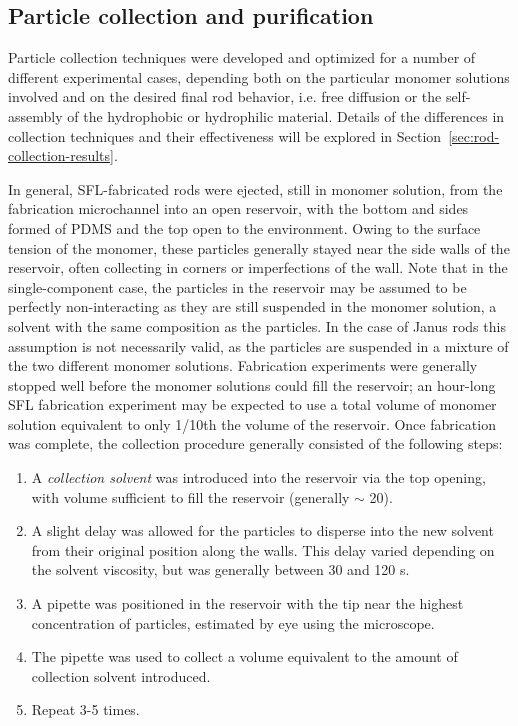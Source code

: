 \begin{itemize}
\end{itemize}


\subsection{Particle collection and purification}

Particle collection techniques were developed and optimized for a number of different experimental cases,
depending both on the particular monomer solutions involved and on the desired final rod behavior, i.e. 
free diffusion or the self-assembly of the hydrophobic or hydrophilic material.  Details of the differences
in collection techniques and their effectiveness will be explored in Section~\ref{sec:rod-collection-results}.

In general, SFL-fabricated rods were ejected, still in monomer solution, from the fabrication microchannel into 
an open reservoir, with the bottom and sides formed of PDMS and the top open to the environment.  Owing to the
surface tension of the monomer, these particles generally stayed near the side walls of the reservoir, often
collecting in corners or imperfections of the wall.  Note that in the single-component case, the particles in
the reservoir may be assumed to be perfectly non-interacting as they are still suspended in the monomer solution, 
a solvent with the
same composition as the particles.   In the case of Janus rods this assumption is not necessarily valid, as
the particles are suspended in a mixture of the two different monomer solutions.  Fabrication experiments were
generally stopped well before the monomer solutions could fill the reservoir; an hour-long SFL fabrication experiment
may be expected to use a total volume of monomer solution equivalent to only 1/10th the volume of the
reservoir.  Once fabrication 
was complete, the collection procedure generally consisted of the following steps:

\begin{enumerate}
\item A \textit{collection solvent} was introduced into the reservoir via the top opening, with volume sufficient to
fill the reservoir (generally $\sim$ 20\uL).
\item A slight delay was allowed for the particles to disperse into the new solvent from their 
original position along the 
walls. This delay varied depending on the solvent viscosity, but was generally between 30 and 120 s.
\item A pipette was positioned in the reservoir with the tip near the highest concentration of particles, estimated
by eye using the microscope.
\item The pipette was used to collect a volume equivalent to the amount of collection solvent introduced.
\item Repeat 3-5 times.
\end{enumerate}

